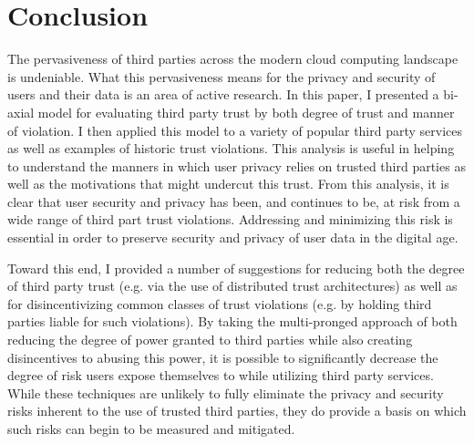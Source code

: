 \section{Conclusion}
\label{sec:conclusion}

The pervasiveness of third parties across the modern cloud computing
landscape is undeniable. What this pervasiveness means for the privacy
and security of users and their data is an area of active research. In
this paper, I presented a bi-axial model for evaluating third party
trust by both degree of trust and manner of violation. I then applied
this model to a variety of popular third party services as well as
examples of historic trust violations. This analysis is useful in
helping to understand the manners in which user privacy relies on
trusted third parties as well as the motivations that might undercut
this trust. From this analysis, it is clear that user security and
privacy has been, and continues to be, at risk from a wide range of
third part trust violations. Addressing and minimizing this risk is
essential in order to preserve security and privacy of user data in
the digital age.

Toward this end, I provided a number of suggestions for reducing both
the degree of third party trust (e.g. via the use of distributed trust
architectures) as well as for disincentivizing common classes of trust
violations (e.g. by holding third parties liable for such
violations). By taking the multi-pronged approach of both reducing the
degree of power granted to third parties while also creating
disincentives to abusing this power, it is possible to significantly
decrease the degree of risk users expose themselves to while utilizing
third party services. While these techniques are unlikely to fully
eliminate the privacy and security risks inherent to the use of
trusted third parties, they do provide a basis on which such risks can
begin to be measured and mitigated.
